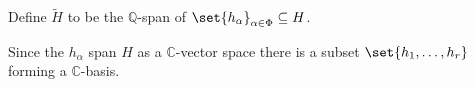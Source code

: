 Define $\tilde{H}$ to be the $\mathbb{Q}$-span of $\set{h_\alpha}_{\alpha \in \Phi} \subseteq H$.

Since the $h_\alpha$ span $H$ as a $\mathbb{C}$-vector space there is a subset
$\set{h_1, \ldots, h_r}$ forming a $\mathbb{C}$-basis.
